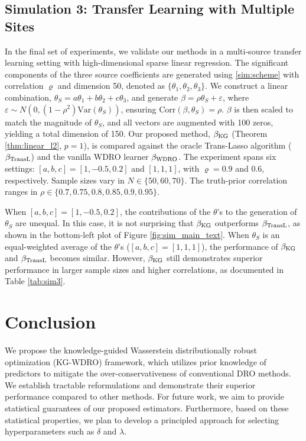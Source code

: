 \documentclass[12pt]{article}
\begin{document}
\subsection{Simulation 3: Transfer Learning with Multiple Sites}
\label{subsec:sim3}
In the final set of experiments, we validate our methods in a multi-source transfer learning setting with high-dimensional sparse linear regression. The significant components of the three source coefficients are generated using \eqref{sim:scheme} with correlation $\varrho$ and dimension 50, denoted as $\{\theta_1, \theta_2, \theta_3\}$. We construct a linear combination, $\theta_S = a\theta_1 + b\theta_2 + c\theta_3$, and generate $\beta = \rho \theta_S + \varepsilon$, where $\varepsilon \sim N(0, (1-\rho^2)\mathrm{Var}(\theta_S))$, ensuring $\mathrm{Corr}(\beta, \theta_S) = \rho$. $\beta$ is then scaled to match the magnitude of $\theta_S$, and all vectors are augmented with 100 zeros, yielding a total dimension of 150. Our proposed method, $\beta_{\rm KG}$ (Theorem \ref{thm:linear_l2}, $p=1$), is compared against the oracle Trans-Lasso algorithm \citep[Algorithm 1]{li2021translasso} ($\beta_{\rm TransL}$) and the vanilla WDRO learner $\beta_{\rm WDRO}$. The experiment spans six settings: $[a, b, c] = [1, -0.5, 0.2]$ and $[1, 1, 1]$, with $\varrho = 0.9$ and $0.6$, respectively. Sample sizes vary in $N \in \{50, 60, 70\}$. The truth-prior correlation ranges in $\rho \in \{0.7, 0.75, 0.8, 0.85, 0.9, 0.95\}$.


When $[a, b, c] = [1, -0.5, 0.2]$, the contributions of the $\theta$'s to the generation of $\theta_S$ are unequal. In this case, it is not surprising that $\beta_{\rm KG}$ outperforms $\beta_{\rm TransL}$, as shown in the bottom-left plot of Figure \ref{fig:sim_main_text}. When $\theta_S$ is an equal-weighted average of the $\theta$'s ($[a, b, c] = [1, 1, 1]$), the performance of $\beta_{\rm KG}$ and $\beta_{\rm TransL}$ becomes similar. However, $\beta_{\rm KG}$ still demonstrates superior performance in larger sample sizes and higher correlations, as documented in Table \ref{tab:sim3}.

\section{Conclusion}
We propose the knowledge-guided Wasserstein
distributionally robust optimization (KG-WDRO) framework, which utilizes prior knowledge of predictors to mitigate the over-conservativeness of  conventional DRO methods. We establish tractable reformulations and demonstrate  their superior performance compared to other methods. For future work, we aim to provide statistical guarantees of our proposed estimators. Furthermore, based on these statistical properties, we plan to develop a principled approach for selecting hyperparameters such as  $\delta$ and $\lambda$.
\end{document}

